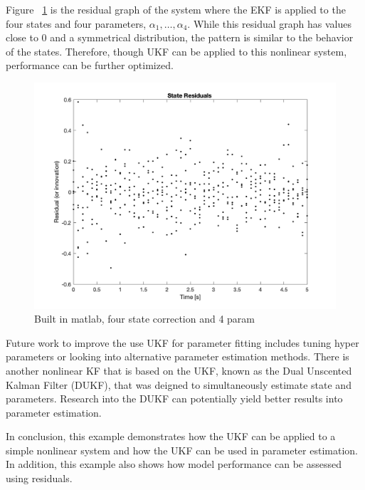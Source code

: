 \noindent Figure ~\ref{fig:4params} is the residual graph of the system where the EKF is applied to the four states and four parameters, $\alpha_1, \hdots, \alpha_4$. While this residual graph has values close to 0 and a symmetrical distribution, the pattern is similar to the behavior of the states. Therefore, though UKF can be applied to this nonlinear system, performance can be further optimized.

\begin{figure}[h]
    \centering
    \includegraphics[scale = 0.6]{UKF_4param_residual.png}
    \caption{Built in matlab, four state correction and 4 param}
    \label{fig:4params}
\end{figure}

\noindent Future work to improve the use UKF for parameter fitting includes tuning hyper parameters or looking into alternative parameter estimation methods. There is another nonlinear KF that is based on the UKF, known as the Dual Unscented Kalman Filter (DUKF), that was deigned to simultaneously estimate state and parameters. Research into the DUKF can potentially yield better results into parameter estimation.

\clearpage


\noindent In conclusion, this example demonstrates how the UKF can be applied to a simple nonlinear system and how the UKF can be used in parameter estimation. In addition, this example also shows how model performance can be assessed using residuals. \\ 

